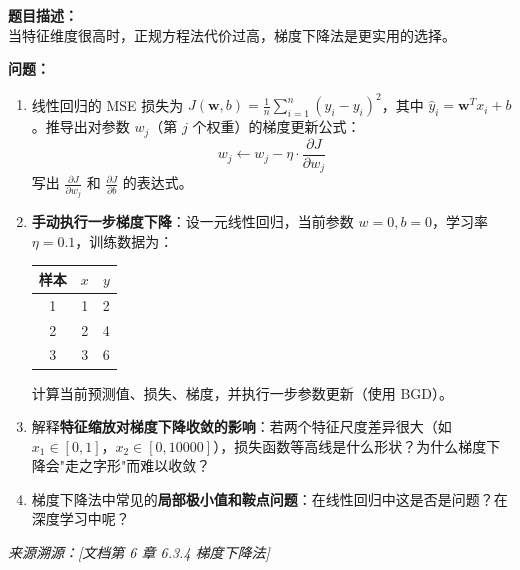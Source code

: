 \documentclass[a4paper,11pt]{ctexart}
\begin{document}
\begin{problembox}
    \textbf{题目描述：}\\
    当特征维度很高时，正规方程法代价过高，梯度下降法是更实用的选择。

    \vspace{0.2cm}
    \textbf{问题：}
    \begin{enumerate}[(1)]
        \item 线性回归的 MSE 损失为 $J(\boldsymbol{w}, b) = \frac{1}{n}\sum_{i=1}^n(\hat{y}_i - y_i)^2$，其中 $\hat{y}_i = \boldsymbol{w}^T x_i + b$。推导出对参数 $w_j$（第 $j$ 个权重）的梯度更新公式：
        \[
        w_j \leftarrow w_j - \eta \cdot \frac{\partial J}{\partial w_j}
        \]
        写出 $\frac{\partial J}{\partial w_j}$ 和 $\frac{\partial J}{\partial b}$ 的表达式。

        \item \textbf{手动执行一步梯度下降}：设一元线性回归，当前参数 $w=0, b=0$，学习率 $\eta=0.1$，训练数据为：

        \begin{center}
        \begin{tabular}{ccc}
            \toprule
            样本 & $x$ & $y$ \\
            \midrule
            1 & 1 & 2 \\
            2 & 2 & 4 \\
            3 & 3 & 6 \\
            \bottomrule
        \end{tabular}
        \end{center}

        计算当前预测值、损失、梯度，并执行一步参数更新（使用 BGD）。

        \item 解释\textbf{特征缩放对梯度下降收敛的影响}：若两个特征尺度差异很大（如 $x_1 \in [0,1]$，$x_2 \in [0,10000]$），损失函数等高线是什么形状？为什么梯度下降会"走之字形"而难以收敛？

        \item 梯度下降法中常见的\textbf{局部极小值和鞍点问题}：在线性回归中这是否是问题？在深度学习中呢？
    \end{enumerate}
    {\color{gray}\small\textit{来源溯源：[文档第 6 章 6.3.4 梯度下降法]}}
\end{problembox}
\end{document}
